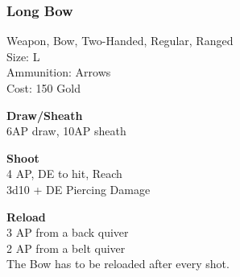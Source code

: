 \subsubsection{Long Bow}\label{weapon:longBow}
Weapon, Bow, Two-Handed, Regular, Ranged\\
Size: L\\
Ammunition: Arrows\\
Cost: 150 Gold

\textbf{Draw/Sheath}\\
6AP draw, 10AP sheath

\textbf{Shoot}\\
4 AP, DE to hit,  Reach\\
3d10 + \texttimes DE Piercing Damage

\textbf{Reload}\\
3 AP from a back quiver\\
2 AP from a belt quiver\\
The Bow has to be reloaded after every shot.
